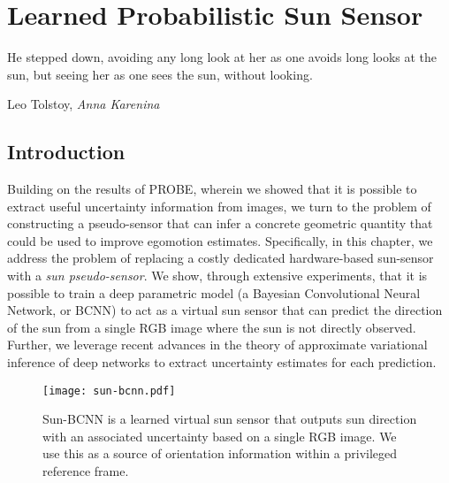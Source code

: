 \chapter{Learned Probabilistic Sun Sensor}
\epigraph{He stepped down, avoiding any long look at her as one avoids long looks at the sun, but seeing her as one sees the sun, without looking.}{Leo Tolstoy, \textit{Anna Karenina}}
\label{ch:sun-bcnn}

\section{Introduction}

Building on the results of PROBE, wherein we showed that it is possible to extract useful uncertainty information from images, we turn to the problem of constructing a pseudo-sensor that can infer a concrete geometric quantity that could be used to improve egomotion estimates. Specifically, in this chapter, we address the problem of replacing a costly dedicated hardware-based sun-sensor with a \textit{sun pseudo-sensor}. We show, through extensive experiments, that it is possible to train a deep parametric model (a Bayesian Convolutional Neural Network, or BCNN) to act as a virtual sun sensor that can predict the direction of the sun from a single RGB image where the sun is not directly observed. Further, we leverage recent advances in the theory of approximate variational inference of deep networks to extract uncertainty estimates for each prediction.


\begin{figure*}[h!]
\centering
\texttt{[image: sun-bcnn.pdf]}
 \caption{Sun-BCNN is a learned virtual sun sensor that outputs sun direction with an associated uncertainty based on a single RGB image. We use this as a source of orientation information within a privileged reference frame.}
 \label{fig:sun-bcnn_intro_fig}
\end{figure*}

